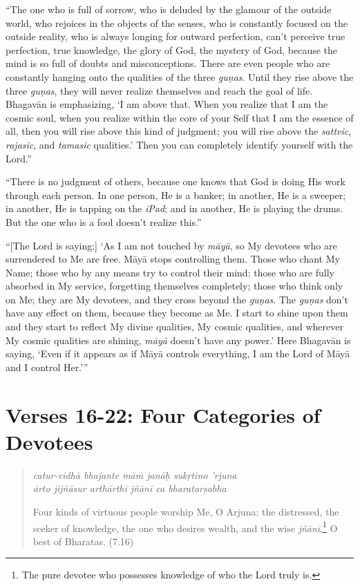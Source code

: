 \documentclass[12pt, twoside, openright]{memoir}
\begin{document}
\enquote{The one who is full of sorrow, who is deluded by the glamour of the outside world, who rejoices in the objects of the senses, who is constantly focused on the outside reality, who is always longing for outward perfection, can’t perceive true perfection, true knowledge, the glory of God, the mystery of God, because the mind is so full of doubts and misconceptions. There are even people who are constantly hanging onto the qualities of the three \textit{guṇas}. Until they rise above the three \textit{guṇas}, they will never realize themselves and reach the goal of life. Bhagavān is emphasizing, \enquote{I am above that. When you realize that I am the cosmic soul, when you realize within the core of your Self that I am the essence of all, then you will rise above this kind of judgment; you will rise above the \textit{sattvic}, \textit{rajasic}, and \textit{tamasic} qualities.} Then you can completely identify yourself with the Lord.}

\enquote{There is no judgment of others, because one knows that God is doing His work through each person. In one person, He is a banker; in another, He is a sweeper; in another, He is tapping on the \textit{iPad}; and in another, He is playing the drums. But the one who is a fool doesn’t realize this.}

\enquote{[The Lord is saying:] \enquote{As I am not touched by \textit{māyā}, so My devotees who are surrendered to Me are free. Māyā stops controlling them. Those who chant My Name; those who by any means try to control their mind; those who are fully absorbed in My service, forgetting themselves completely; those who think only on Me; they are My devotees, and they cross beyond the \textit{guṇas}. The \textit{guṇas} don’t have any effect on them, because they become as Me. I start to shine upon them and they start to reflect My divine qualities, My cosmic qualities, and wherever My cosmic qualities are shining, \textit{māyā} doesn’t have any power.} Here Bhagavān is saying, \enquote{Even if it appears as if Māyā controls everything, I am the Lord of Māyā and I control Her.}}

\section{Verses 16-22: Four Categories of Devotees}\label{sec-verses-16-22-four-categories-of-devotees}


\par
\begin{verse}
\textit{catur-vidhā bhajante māṁ janāḥ sukṛtino ’rjuna} \\
\textit{ārto jijñāsur arthārthī jñānī ca bharatarṣabha}

\noindent Four kinds of virtuous people worship Me, O Arjuna: the distressed, the seeker of knowledge, the one who desires wealth, and the wise \textit{jñānī},\footnote{The pure devotee who possesses knowledge of who the Lord truly is.} O best of Bharatas. (7.16)
\end{verse}
\par
\end{document}
